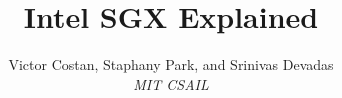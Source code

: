 \documentclass[11pt,twocolumn]{article}
\begin{document}
\title{Intel SGX Explained}
\author{Victor Costan, Staphany Park, and Srinivas Devadas \\ \em MIT CSAIL}
\date{}

\maketitle






%
%

\setlength{\bibsep}{1pt}
\small

%

\end{document}
